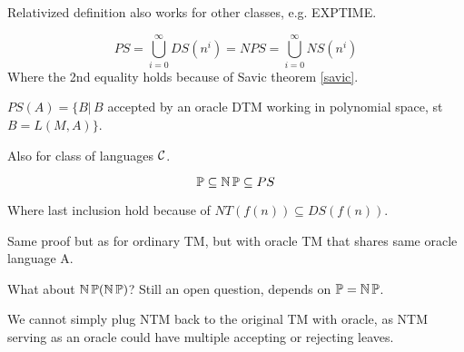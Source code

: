 \begin{note}
	Relativized definition also works for other classes, e.g. EXPTIME.
\end{note}

\begin{definition}[PS]
	\[ PS = \bigcup_{i = 0}^{\infty} DS(n^i) = NPS = \bigcup_{i = 0}^{\infty} NS(n^i) \]
	Where the 2nd equality holds because of Savic theorem \cref{savic}.
\end{definition}

\begin{definition}[PS(A)]
	$PS(A) = \{ B | \, B$ accepted by an oracle DTM working in polynomial space, st $B = L(M, A)\}$.

	Also for class of languages $\operatorname{\mathcal{C}}$.
\end{definition}

\begin{note}
	\[ \operatorname{\mathbb{P}} \subseteq \operatorname{\operatorname{\mathbb{N}}\mathbb{P}} \subseteq PS \]

	Where last inclusion hold because of $NT(f(n)) \subseteq DS(f(n))$.

	Same proof but as for ordinary TM, but with oracle TM that shares same oracle language A.
\end{note}

\begin{observation}
	What about $\operatorname{\operatorname{\mathbb{N}}\mathbb{P}}(\operatorname{\operatorname{\mathbb{N}}\mathbb{P}})$? Still an open question, depends on $\operatorname{\mathbb{P}} = \operatorname{\operatorname{\mathbb{N}}\mathbb{P}}$.

	We cannot simply plug NTM back to the original TM with oracle, as NTM serving as an oracle could have multiple accepting or rejecting leaves.
\end{observation}

